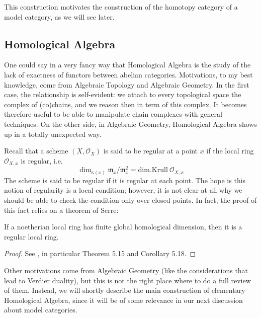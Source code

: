 \begin{refsection}
This construction motivates the construction of the homotopy category of a model category, as we will see later.

\subsection{Homological Algebra}

One could say in a very fancy way that Homological Algebra is the study of the lack of exactness of functors between abelian categories. Motivations, to my best knowledge, come from Algebraic Topology and Algebraic Geometry. In the first case, the relationship is self-evident: we attach to every topological space the complex of (co)chains, and we reason then in term of this complex. It becomes therefore useful to be able to manipulate chain complexes with general techniques. On the other side, in Algebraic Geometry, Homological Algebra shows up in a totally unexpected way.

Recall that a scheme $(X,\mathscr O_X)$ is said to be regular at a point $x$ if the local ring $\mathscr O_{X,x}$ is regular, i.e.
\[
\dim_{\kappa(x)} \mathfrak m_x / \mathfrak m_x^2 = \mathrm{dim.Krull } \: \mathscr O_{X,x}
\]
The scheme is said to be regular if it is regular at each point. The hope is this notion of regularity is a local condition; however, it is not clear at all why we should be able to check the condition only over closed points. In fact, the proof of this fact relies on a theorem of Serre:

\begin{thm} \label{thm regularity}
If a noetherian local ring has finite global homological dimension, then it is a regular local ring.
\end{thm}

\begin{proof}
See \cite{altman}, in particular Theorem 5.15 and Corollary 5.18.
\end{proof}

Other motivations come from Algebraic Geometry (like the considerations that lead to Verdier duality), but this is not the right place where to do a full review of them. Instead, we will shortly describe the main construction of elementary Homological Algebra, since it will be of some relevance in our next discussion about model categories.


\end{refsection}
